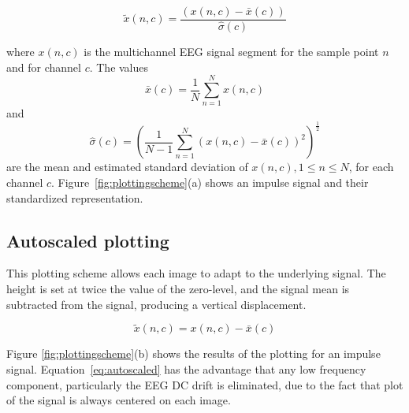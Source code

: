 \begin{equation}
\tilde{x}(n,c) =  \frac{( x(n,c) - \bar{x}(c)  )}{ \hat{\sigma}(c) } 
\label{eq:standarizedaverages}
\end{equation}

\noindent  where $ x(n,c) $ is the multichannel EEG signal segment for the sample point $n$ and for channel $c$. The values $$\bar{x}(c) =\frac{1}{N}\sum_{n=1}^{N}x(n,c)$$ and $$ \hat{\sigma}(c) = (\frac{1}{N-1}\sum_{n=1}^{N}(x(n,c)-\bar{x}(c))^2 )^{\frac{1}{2}}$$ are the mean and estimated standard deviation of $x(n,c), 1 \leq n \leq N$, for each channel $c$. Figure~\ref{fig:plottingscheme}(a) shows an impulse signal and their standardized representation.

\subsection{Autoscaled plotting}

This plotting scheme allows each image to adapt to the underlying signal.  The height is set at twice the value of the zero-level, and the signal mean is subtracted from the signal, producing a vertical displacement.

\begin{equation}
\tilde{x}(n,c) =  x(n,c) - \bar{x}(c) 
\label{eq:autoscaled}
\end{equation}

Figure \ref{fig:plottingscheme}(b) shows the results of the plotting for an impulse signal.  Equation~\ref{eq:autoscaled} has the advantage that any low frequency component, particularly the EEG DC drift is eliminated, due to the fact that plot of the signal is always centered on each image.

